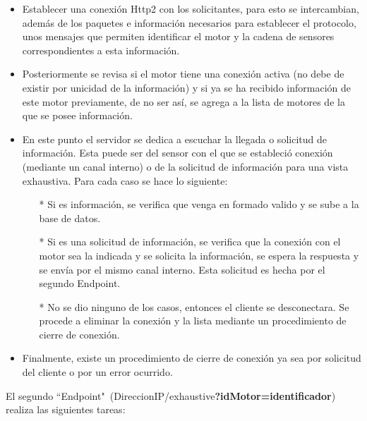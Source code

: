     \begin{itemize}
        \item Establecer una conexión Http2 con los solicitantes, para esto se intercambian,
            además de los paquetes e información necesarios para establecer el protocolo,
            unos mensajes que permiten identificar el motor y la cadena de sensores
            correspondientes a esta información.
        \item Posteriormente se revisa si el motor
            tiene una conexión activa (no debe de existir por unicidad de la información)
            y si ya se ha recibido información de este motor previamente, de no ser así,
            se agrega a la lista de motores de la que se posee información.
        \item En este punto el servidor se dedica a escuchar la llegada o solicitud
            de información. Esta puede ser del sensor con el que se estableció
            conexión (mediante un canal interno) o  de la solicitud de información
            para una vista exhaustiva. Para cada caso se hace lo siguiente:
            \begin{itemize}
                \item[*] Si es información, se verifica que venga en formado valido
                    y se sube a la base de datos.
                \item[*] Si es una solicitud de información, se verifica que
                    la conexión con el motor sea la indicada y se solicita la
                    información, se espera la respuesta y se envía por el mismo
                    canal interno. Esta solicitud es hecha por el segundo Endpoint.
                \item[*] No se dio ninguno de los casos, entonces el cliente se
                    desconectara. Se procede a eliminar la conexión y la lista
                    mediante un procedimiento de cierre de conexión.
            \end{itemize}
        \item Finalmente, existe un procedimiento de cierre de conexión ya sea
            por solicitud del cliente o por un error ocurrido.
    \end{itemize}


    El segundo ``Endpoint"\ (DireccionIP/exhaustive\textbf{?idMotor=identificador})
    realiza las siguientes tareas:

